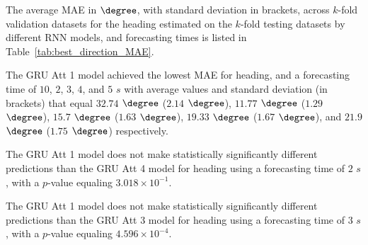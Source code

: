 The average MAE in $\degree$, with standard deviation in brackets, across $k$-fold validation datasets for the heading estimated on the $k$-fold testing datasets by different RNN models, and forecasting times is listed in Table~\ref{tab:best_direction_MAE}.

\begin{table}[!ht]
	\centering
	\caption{The average MAE in $\degree$, with standard deviation in brackets, across $k$-fold validation datasets for the heading estimated on the $k$-fold testing datasets by different RNN models, and forecasting times.}
	\label{tab:best_direction_MAE}
\end{table}

The GRU Att 1 model achieved the lowest MAE for heading, and a forecasting time of $10$, $2$, $3$, $4$, and $5$ $s$ with average values and standard deviation (in brackets) that equal $32.74$ $\degree$ ($2.14$ $\degree$), $11.77$ $\degree$ ($1.29$ $\degree$), $15.7$ $\degree$ ($1.63$ $\degree$), $19.33$ $\degree$ ($1.67$ $\degree$), and $21.9$ $\degree$ ($1.75$ $\degree$) respectively.

The GRU Att 1 model does not make statistically significantly different predictions than the GRU Att 4 model for heading using a forecasting time of $2$ $s$, with a $p$-value equaling $3.018 \times 10^{-1}$.

The GRU Att 1 model does not make statistically significantly different predictions than the GRU Att 3 model for heading using a forecasting time of $3$ $s$, with a $p$-value equaling $4.596 \times 10^{-4}$.

